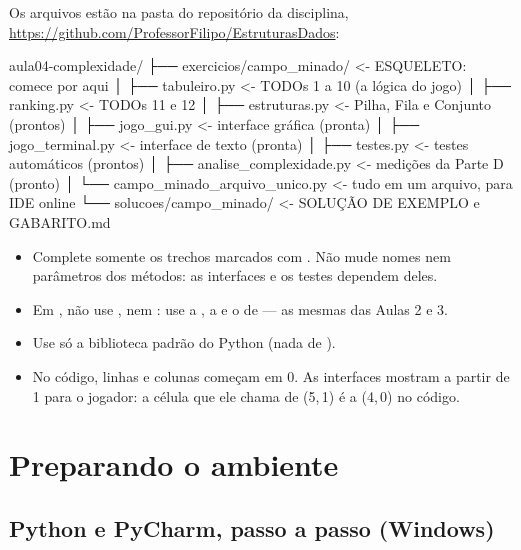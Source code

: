 \documentclass[11pt]{article}
\begin{document}
Os arquivos estão na pasta  do repositório da disciplina,
\url{https://github.com/ProfessorFilipo/EstruturasDados}:

\begin{arvore}
aula04-complexidade/
├── exercicios/campo_minado/     <- ESQUELETO: comece por aqui
│   ├── tabuleiro.py             <- TODOs 1 a 10 (a lógica do jogo)
│   ├── ranking.py               <- TODOs 11 e 12
│   ├── estruturas.py            <- Pilha, Fila e Conjunto (prontos)
│   ├── jogo_gui.py              <- interface gráfica (pronta)
│   ├── jogo_terminal.py         <- interface de texto (pronta)
│   ├── testes.py                <- testes automáticos (prontos)
│   ├── analise_complexidade.py  <- medições da Parte D (pronto)
│   └── campo_minado_arquivo_unico.py   <- tudo em um arquivo, para IDE online
└── solucoes/campo_minado/       <- SOLUÇÃO DE EXEMPLO e GABARITO.md
\end{arvore}

\begin{itemize}
  \item Complete somente os trechos marcados com . Não mude nomes nem parâmetros
        dos métodos: as interfaces e os testes dependem deles.
  \item Em , não use ,  nem
        : use a , a  e o  de
         — as mesmas das Aulas 2 e 3.
  \item Use só a biblioteca padrão do Python (nada de ).
  \item No código, linhas e colunas começam em 0. As interfaces mostram a partir de 1 para o
        jogador: a célula que ele chama de (5,\,1) é a (4,\,0) no código.
\end{itemize}

\section{Preparando o ambiente}

\subsection{Python e PyCharm, passo a passo (Windows)}
\end{document}

